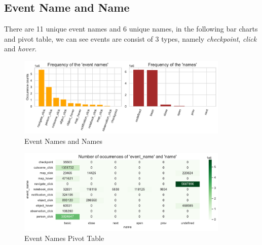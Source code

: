 \documentclass[11pt,a4paper]{article}
\begin{document}
    \subsection{Event Name and Name}
    There are 11 unique event names and 6 unique names, in the following bar charts and pivot table, we can see events are consist of 3 types, namely \textit{checkpoint}, \textit{click} and \textit{hover}.
    \begin{figure}[H]
        \centering
        \includegraphics[width = 0.9\textwidth]{EDA_plot/event_name.pdf}
        \caption{Event Names and Names}
        \label{fig:event_name}
    \end{figure}
    \begin{figure}[H]
        \centering
        \includegraphics[width = 0.9\textwidth]{EDA_plot/event_name_pivot.pdf}
        \caption{Event Names Pivot Table}
        \label{fig:event_name_table}
    \end{figure}
\end{document}
